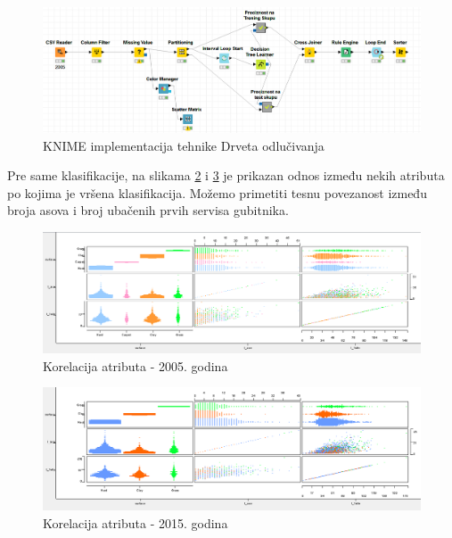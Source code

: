 \documentclass[a4paper]{article}
\begin{document}
\begin{figure}[H]
	\begin{center}
		\includegraphics[width=\textwidth]{Klasifikacija/DrvoOdlucivanja/KNIME_DrvoOdlucivanjaCvorovi.png}
	\end{center}
	\caption{KNIME implementacija tehnike Drveta odlučivanja}
	\label{fig:KNIME_CvoroviKlasifikacija}
\end{figure}

Pre same klasifikacije, na slikama \ref{fig:KlasifikacijaScatterMatrix2005} i \ref{fig:KlasifikacijaScatterMatrix2015} je prikazan odnos između nekih atributa po kojima je vršena klasifikacija. Možemo primetiti tesnu povezanost između broja asova i broj ubačenih prvih servisa gubitnika. 

\begin{figure}[H]
	\begin{center}
		\includegraphics[width=\textwidth]{Klasifikacija/DrvoOdlucivanja/2005/KorelacijaAsInSurface.png}
	\end{center}
	\caption{ Korelacija atributa - 2005. godina}
	\label{fig:KlasifikacijaScatterMatrix2005}
\end{figure}
\begin{figure}[H]
	\begin{center}
		\includegraphics[width=\textwidth]{Klasifikacija/DrvoOdlucivanja/2015/KorelacijaAsInSurface.png}
	\end{center}
	\caption{ Korelacija atributa - 2015. godina}
	\label{fig:KlasifikacijaScatterMatrix2015}
\end{figure}
\end{document}
